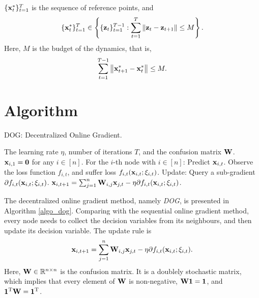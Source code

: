 \documentclass{article}
\begin{document}
$\{{\bf x}_t^\ast\}_{t=1}^T$ is the sequence of reference points, and 
\begin{align}
\nonumber
\{{\bf x}_t^\ast\}_{t=1}^T \in \left\{ \{{\bf z}_t\}_{t=1}^{T-1} : \sum_{t=1}^T \left\lVert{\bf z}_t - {\bf z}_{t+1}\right\rVert \le M \right\}.
\end{align} Here, $M$ is the budget of the dynamics, that is,
\begin{align}
\label{equa_define_M}
\sum_{t=1}^{T-1} \left\lVert{\bf x}_{t+1}^\ast - {\bf x}_t^\ast\right\rVert \le M.
\end{align}







\section{Algorithm}


\newcommand\StateX{\Statex\hspace{\algorithmicindent}}
\begin{algorithm}[!]
   \caption{DOG: Decentralized Online Gradient.}
   \label{algo_dog}
   \begin{algorithmic}[1]
   \Require The learning rate $\eta$, number of iterations $T$, and the confusion matrix ${\bf W}$. ${\bf x}_{i,1} = {\bf 0}$ for any $i\in [n]$.
           \StateX For the $i$-th node with $i\in[n]$:
            \State \indent Predict ${\bf x}_{i,t}$.
            \State \indent Observe the loss function $f_{i,t}$,
            \StateX \indent and suffer loss $f_{i,t}({\bf x}_{i,t};\xi_{i,t})$.
            \StateX Update:
            \State \indent Query a sub-gradient $\partial f_{i,t}({\bf x}_{i,t};\xi_{i,t})$.  
            \State \indent ${\bf x}_{i,t+1} = \sum_{j=1}^n {\bf W}_{i,j}{\bf x}_{j,t} - \eta \partial f_{i,t}({\bf x}_{i,t};\xi_{i,t})$. 
       \EndFor
   \end{algorithmic}
\end{algorithm}


The decentralized online gradient method, namely \textit{DOG}, is presented in Algorithm \ref{algo_dog}. Comparing with the sequential online gradient method, every node needs to collect the decision variables from its neighbours, and then update its decision variable. The update rule is 
\begin{align}
\nonumber
{\bf x}_{i,t+1} = \sum_{j=1}^n {\bf W}_{i,j}{\bf x}_{j,t} - \eta \partial f_{i,t}({\bf x}_{i,t};\xi_{i,t}).
\end{align} Here, ${\bf W} \in\mathbb{R}^{n \times n}$ is the confusion matrix. It is a doublely stochastic matrix, which implies that every element of ${\bf W}$ is non-negative, ${\bf W} {\bf 1} = {\bf 1}$, and ${\bf 1}^{\rm T}{\bf W}  = {\bf 1}^{\rm T}$. 
   
\end{document}
